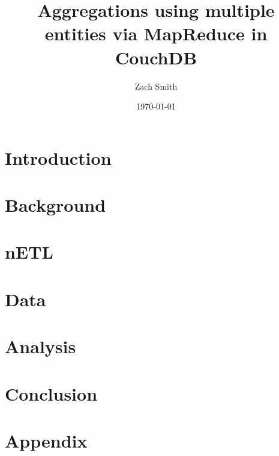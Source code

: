 \documentclass[
    parskip=full,
    a4paper
]{report}
\title{Aggregations using multiple entities via MapReduce in CouchDB}
\author{Zach Smith}
\date{\today}
\begin{document}
\maketitle
\thispagestyle{empty}

\begin{abstract}
    
\end{abstract}
\newpage

\tableofcontents
\newpage

\chapter{Introduction}


\chapter{Background}





\chapter{nETL}






\chapter{Data}






\chapter{Analysis}


\chapter{Conclusion}




\newpage




\appendix
\chapter{Appendix}





\listoffigures
\listoftables
\newpage

\end{document}
